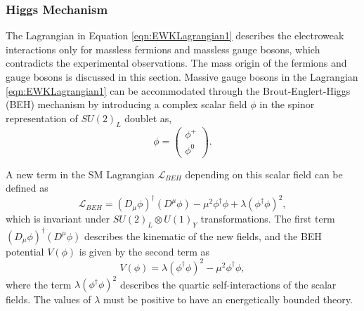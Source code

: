 \subsubsection{Higgs Mechanism}
\label{subsubsec:HiggsMech}

The Lagrangian in Equation \ref{eqn:EWKLagrangian1} describes the electroweak interactions only for massless fermions and massless gauge bosons, which contradicts the experimental observations. The mass origin of the fermions and gauge bosons is discussed in this section. Massive gauge bosons in the Lagrangian \ref{eqn:EWKLagrangian1} can be accommodated through the Brout-Englert-Higgs (BEH) mechanism by introducing a complex scalar field $\phi$ in the spinor representation of $SU(2)_{L}$ doublet \cite{HiggsMechanism} as,
\begin{equation}
\phi = \begin{pmatrix} \phi^{+} \\ \phi^{0} \end{pmatrix}.
\end{equation}

A new term in the SM Lagrangian $\mathcal{L}_{BEH}$ depending on this scalar field can be defined as 
\begin{equation}
\mathcal{L}_{BEH}  = (D_{\mu} \phi)^{\dagger} ( D^{\mu} \phi) - \mu^2 \phi^{\dagger} \phi + \lambda (\phi^{\dagger} \phi)^2,
\label{eqn:LagBEH}
\end{equation}
which is invariant under $SU(2)_L \otimes U(1)_Y$ transformations. The first term $(D_{\mu} \phi)^{\dagger} ( D^{\mu} \phi)$ describes the kinematic of the new fields, and the BEH potential $V(\phi)$ is given by the second term as 
\begin{equation}
V(\phi) = \lambda (\phi^{\dagger} \phi)^2 - \mu^2 \phi^{\dagger} \phi,
\label{eqn:HiggsPot}
\end{equation}
where the term $\lambda (\phi^{\dagger} \phi)^2$ describes the quartic self-interactions of the scalar fields. The values of $\lambda$ must be positive to have an energetically bounded theory. 

